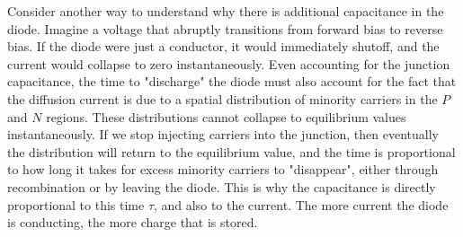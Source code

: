 Consider another way to understand why there is additional capacitance in the diode.  Imagine a voltage that abruptly transitions from forward bias to reverse bias.  If the diode were just a conductor, it would immediately shutoff, and the current would collapse to zero instantaneously.  Even accounting for the junction capacitance, the time to "discharge" the diode must also account for the fact that the diffusion current is due to a spatial distribution of minority carriers in the $P$ and $N$ regions.  These distributions cannot collapse to equilibrium values instantaneously.  If we stop injecting carriers into the junction, then eventually the distribution will return to the equilibrium value, and the time is proportional to how long it takes for excess minority carriers to "disappear", either through recombination or by leaving the diode.  This is why the capacitance is directly proportional to this time $\tau$, and also to the current.  The more current the diode is conducting, the more charge that is stored.  
